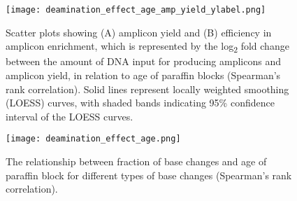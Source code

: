 \newpage
\begin{figure}[H]
	\centering
	\texttt{[image: deamination\_effect\_age\_amp\_yield\_ylabel.png]}
	\caption[Scatter plots showing (A) amplicon yield and (B) efficiency in amplicon enrichment, which is represented by the log\textsubscript{2} fold change between the amount of DNA input for producing amplicons and amplicon yield, in relation to age of paraffin blocks (Spearman's rank correlation).]{Scatter plots showing (A) amplicon yield and (B) efficiency in amplicon enrichment, which is represented by the log\textsubscript{2} fold change between the amount of DNA input for producing amplicons and amplicon yield, in relation to age of paraffin blocks (Spearman's rank correlation). Solid lines represent locally weighted smoothing (LOESS) curves, with shaded bands indicating 95\% confidence interval of the LOESS curves.}
	\label{fig:deamination_effect_age_amp_yield}
\end{figure}


\begin{figure}[H]
	\centering
	\texttt{[image: deamination\_effect\_age.png]}
	\caption{The relationship between fraction of base changes and age of paraffin block for different types of base changes (Spearman's rank correlation).}
	\label{fig:deamination_effect_age}
\end{figure}


